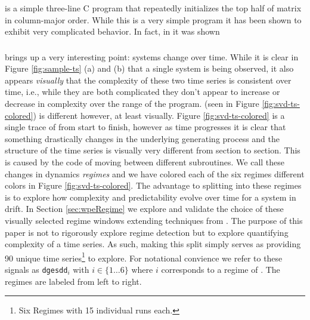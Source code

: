 \subsubsection{\col}
\col is a simple three-line C program that repeatedly initializes the top half of matrix in column-major order. While this is a very simple program it has been shown to exhibit very complicated behavior. In fact, in \cite{chaos} it was shown 
\subsubsection{\gcc}

\subsubsection{\svd}
\svd brings up a very interesting point: systems change over time. While it is clear in Figure \ref{fig:sample-ts} (a) and (b) that a single system is being observed, it also appears \emph{visually} that the complexity of these two time series is consistent over time, i.e., while they are both complicated they don't appear to increase or decrease in complexity over the range of the program. \svd (seen in Figure \ref{fig:svd-ts-colored}) is different however, at least visually. Figure \ref{fig:svd-ts-colored} is a single trace of \svd from start to finish, however as time progresses it is clear that something drastically changes in the underlying generating process and the structure of the time series is visually very different from section to section. This is caused by the code of \svd moving between different subroutines. We call these changes in \svd dynamics  \emph{\svd regimes} and we have colored each of the six regimes different colors in Figure \ref{fig:svd-ts-colored}. The advantage to splitting \svd into these regimes is to explore how complexity and predictability evolve over time for a system in drift. In Section \ref{sec:wpeRegime} we explore and validate the choice of these visually selected regime windows extending techniques from \cite{cao2004det}. The purpose of this paper is not to rigorously explore regime detection but to explore quantifying complexity of a time series. As such, making this split simply serves as providing 90 unique time series\footnote{Six Regimes with 15 individual runs each.} to explore. For notational convience we refer to these signals as {\tt dgesdd$_i$} with $i \in \{1\dots6\}$ where $i$ corresponds to a regime of \svd. The regimes are labeled from left to right. 



